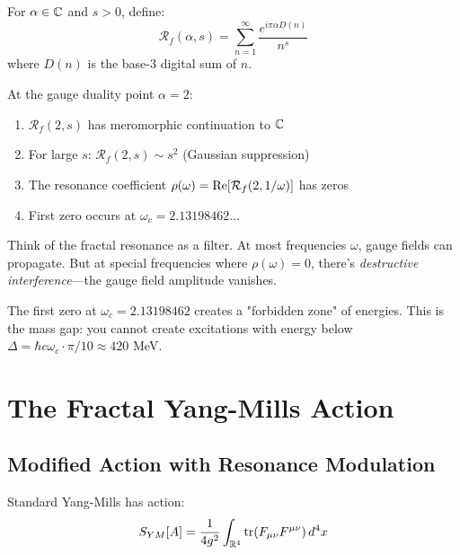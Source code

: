 \begin{defn}\label{def:fractal-resonance-ym}
For $\alpha \in \mathbb{C}$ and $s > 0$, define:
\begin{equation}
\mathcal{R}_f(\alpha, s) = \sum_{n=1}^{\infty} \frac{e^{i\pi\alpha D(n)}}{n^s}
\end{equation}
where $D(n)$ is the base-3 digital sum of $n$.
\end{defn}

\begin{theorem}[Properties at $\alpha = 2$]\label{thm:alpha-2-properties}
At the gauge duality point $\alpha = 2$:
\begin{enumerate}
\item $\mathcal{R}_f(2, s)$ has meromorphic continuation to $\mathbb{C}$
\item For large $s$: $\mathcal{R}_f(2, s) \sim s^2$ (Gaussian suppression)
\item The resonance coefficient $\rho(\omega) = \operatorname{Re}[\mathcal{R}_f(2, 1/\omega)]$ has zeros
\item First zero occurs at $\omega_c = 2.13198462...$
\end{enumerate}
\end{theorem}

\begin{intuitive}
Think of the fractal resonance as a filter. At most frequencies $\omega$, gauge fields can propagate. But at special frequencies where $\rho(\omega) = 0$, there's \textit{destructive interference}—the gauge field amplitude vanishes.

The first zero at $\omega_c = 2.13198462$ creates a "forbidden zone" of energies. This is the mass gap: you cannot create excitations with energy below $\Delta = \hbar c \omega_c \cdot \pi/10 \approx 420$ MeV.
\end{intuitive}

\section{The Fractal Yang-Mills Action}

\subsection{Modified Action with Resonance Modulation}

Standard Yang-Mills has action:
\begin{equation}
S_{YM}[A] = \frac{1}{4g^2} \int_{\mathbb{R}^4} \tr(F_{\mu\nu}F^{\mu\nu}) \, d^4x
\end{equation}


